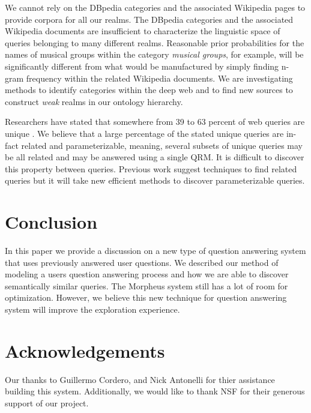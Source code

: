 We cannot rely on the DBpedia categories and the associated Wikipedia
pages to provide corpora for all our realms.  The DBpedia categories
and the associated Wikipedia documents are insufficient to
characterize the linguistic space of queries belonging to many
different realms.  Reasonable prior probabilities for the names of
musical groups within the category \emph{musical groups}, for example,
will be significantly different from what would be manufactured by
simply finding n-gram frequency within the related Wikipedia
documents. We are investigating methods to identify categories within
the deep web and to find new sources to construct \textit{weak} realms
in our ontology hierarchy.


Researchers have stated that somewhere from 39 to 63 percent of web
queries are unique \cite{1277770,331405,621942}.  We believe that a
large percentage of the stated unique queries are in-fact related and
parameterizable, meaning, several subsets of unique queries may be all
related and may be answered using a single QRM.  It is difficult to
discover this property between queries.  Previous work suggest
techniques to find related queries but it will take new efficient
methods to discover parameterizable queries.


\section{Conclusion}

In this paper we provide a discussion on a new type of question
answering system that uses previously answered user questions.  We
described our method of modeling a users question answering process
and how we are able to discover semantically similar queries.  The Morpheus system still has a lot of room for optimization.  However, we believe this new technique for question answering system will improve the exploration experience.


\section{Acknowledgements}
Our thanks to Guillermo Cordero, and Nick Antonelli for thier assistance building this system. Additionally, we would like to thank NSF for their generous support of our project.
